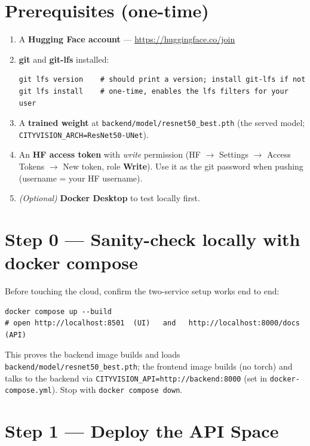 \documentclass[11pt]{article}
\newcommand{\code}[1]{\lstinline[basicstyle=\ttfamily\normalsize]|#1|}
\newcommand{\rarr}{$\rightarrow$}
\begin{document}
\section{Prerequisites (one-time)}

\begin{enumerate}
  \item A \textbf{Hugging Face account} --- \url{https://huggingface.co/join}
  \item \textbf{git} and \textbf{git-lfs} installed:
\begin{lstlisting}[style=block]
git lfs version    # should print a version; install git-lfs if not
git lfs install    # one-time, enables the lfs filters for your user
\end{lstlisting}
  \item A \textbf{trained weight} at \code{backend/model/resnet50_best.pth} (the
    served model; \code{CITYVISION_ARCH=ResNet50-UNet}).
  \item An \textbf{HF access token} with \emph{write} permission (HF \rarr{} Settings
    \rarr{} Access Tokens \rarr{} New token, role \textbf{Write}). Use it as the git
    password when pushing (username = your HF username).
  \item \emph{(Optional)} \textbf{Docker Desktop} to test locally first.
\end{enumerate}

\section{Step 0 — Sanity-check locally with docker compose}

Before touching the cloud, confirm the two-service setup works end to end:
\begin{lstlisting}[style=block]
docker compose up --build
# open http://localhost:8501  (UI)   and   http://localhost:8000/docs  (API)
\end{lstlisting}

This proves the backend image builds and loads
\code{backend/model/resnet50_best.pth}; the frontend image builds (no torch) and
talks to the backend via \code{CITYVISION_API=http://backend:8000} (set in
\code{docker-compose.yml}). Stop with \code{docker compose down}.

\section{Step 1 — Deploy the API Space}
\end{document}
